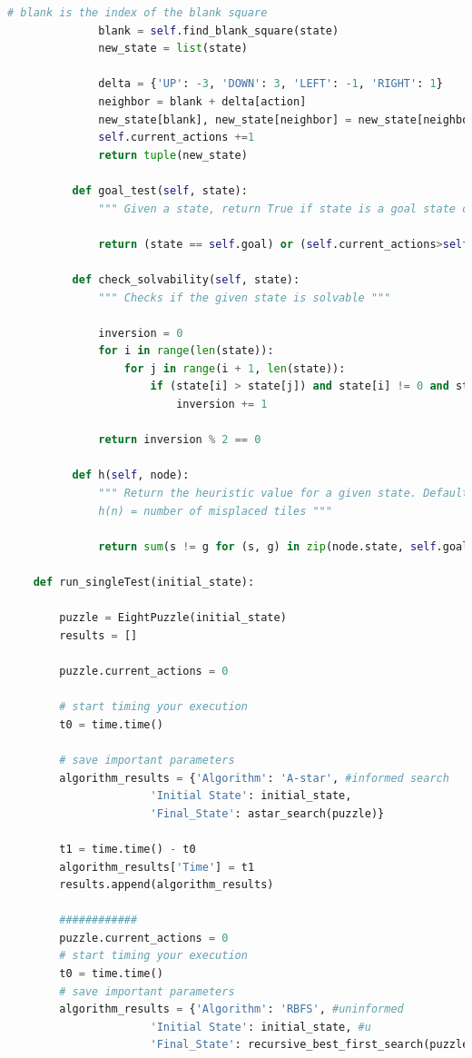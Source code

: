 \documentclass{article}
\begin{document}
\begin{lstlisting}[language=Python, caption=Full Code Listing]
           	  # blank is the index of the blank square
	          blank = self.find_blank_square(state)
	          new_state = list(state)
	
           	  delta = {'UP': -3, 'DOWN': 3, 'LEFT': -1, 'RIGHT': 1}
	          neighbor = blank + delta[action]
	          new_state[blank], new_state[neighbor] = new_state[neighbor], new_state[blank]
	          self.current_actions +=1
	          return tuple(new_state)
	
	      def goal_test(self, state):
	          """ Given a state, return True if state is a goal state or False, otherwise """
	
	          return (state == self.goal) or (self.current_actions>self.max_actions)
	
   	      def check_solvability(self, state):
	          """ Checks if the given state is solvable """
	
	          inversion = 0
	          for i in range(len(state)):
	              for j in range(i + 1, len(state)):
	                  if (state[i] > state[j]) and state[i] != 0 and state[j] != 0:
	                      inversion += 1
	
	          return inversion % 2 == 0
	
     	  def h(self, node):
	          """ Return the heuristic value for a given state. Default heuristic function used is 
	          h(n) = number of misplaced tiles """
	
	          return sum(s != g for (s, g) in zip(node.state, self.goal))
	
    def run_singleTest(initial_state):
	
        puzzle = EightPuzzle(initial_state)
	    results = []        
	
	    puzzle.current_actions = 0 
	          
	    # start timing your execution
	    t0 = time.time()
	          
	    # save important parameters
	    algorithm_results = {'Algorithm': 'A-star', #informed search
		              'Initial State': initial_state,
		              'Final_State': astar_search(puzzle)} 
	
	    t1 = time.time() - t0
	    algorithm_results['Time'] = t1
	    results.append(algorithm_results)
	
	    ############
	    puzzle.current_actions = 0 
	    # start timing your execution
	    t0 = time.time()
	    # save important parameters
	    algorithm_results = {'Algorithm': 'RBFS', #uninformed
		              'Initial State': initial_state, #u
		              'Final_State': recursive_best_first_search(puzzle)} 
	

\end{lstlisting}
\end{document}
